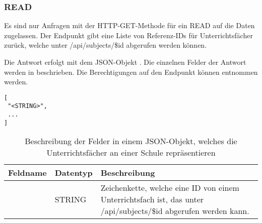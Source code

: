 \subsubsection{READ}
\label{sec:rest:api:schools:subjects:read}
Es sind nur Anfragen mit der HTTP-GET-Methode für ein READ auf die Daten zugelassen.
Der Endpunkt gibt eine Liste von Referenz-IDs für Unterrichtsfächer zurück, welche unter /api/subjects/\$id abgerufen werden können.

Die Antwort erfolgt mit dem JSON-Objekt . 
Die einzelnen Felder der Antwort werden in  beschrieben.
Die Berechtigungen auf den Endpunkt können  entnommen werden.


\begin{lstlisting}[caption={JSON-Antwort für einen GET-Aufruf des Pfads /api/schools/\$id/subjects},label={lst:code:rest:api:schools:subjects:read:ret},frame=tlrb]
[
 "<STRING>",
 ...
]
\end{lstlisting}
\begin{longtable}{|p{}|p{}|p{}|}
		\caption{Beschreibung der Felder in einem JSON-Objekt, welches die Unterrichtsfächer an einer Schule repräsentieren}
\endfoot
		\caption{Beschreibung der Felder in einem JSON-Objekt, welches die Unterrichtsfächer an einer Schule repräsentieren}
		\label{tab:rest:api:schools:subjects:read:ret:json}
\endlastfoot 
\hline
			\textbf{Feldname} & \textbf{Datentyp} & \textbf{Beschreibung} \\ \hline
\endhead
 & STRING & Zeichenkette, welche eine ID von einem Unterrichtsfach ist, das unter /api/subjects/\$id abgerufen werden kann. \\ \hline
\end{longtable}